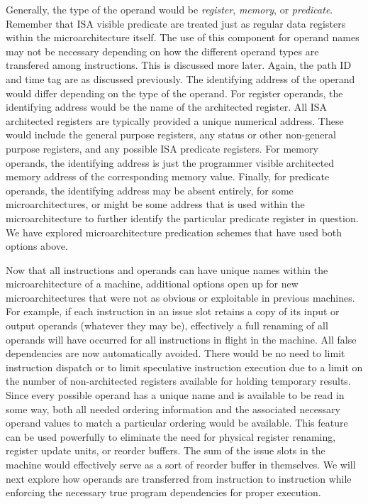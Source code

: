 \documentclass[10pt,dvips]{article}
\begin{document}
Generally, the type of the operand would be \textit{register},
\textit{memory}, or \textit{predicate}.
Remember that ISA visible predicate are treated just as regular
data registers within the microarchitecture itself.
The use of this component for operand names may not be
necessary depending on how the different operand types
are transfered among instructions.
This is discussed more later.
Again, the path ID and time tag are as discussed previously.
The identifying address of the operand would differ
depending on the type of the operand.
For register operands, the identifying address would be
the name of the architected register.
All ISA architected registers are typically provided a
unique numerical address.  These would include the
general purpose registers, any status or other non-general
purpose registers, and any possible ISA predicate registers.
For memory operands, the identifying address is just the
programmer visible architected memory address of the corresponding
memory value.
Finally, for predicate operands, the identifying address
may be absent entirely, for some microarchitectures, or
might be some address that is used within the microarchitecture
to further identify the particular predicate register in question.
We have explored microarchitecture predication schemes that 
have used both options above.

Now that all instructions and operands can have
unique names within the microarchitecture of a machine,
additional options open up for new microarchitectures
that were not as obvious or exploitable in previous
machines.
For example, if each instruction in an issue slot
retains a copy of its input or output operands (whatever
they may be), effectively a full renaming of
all operands will have occurred for all instructions
in flight in the machine.  
All false dependencies are now automatically avoided.
There would be no need to limit instruction dispatch or to limit speculative
instruction execution due to a limit on the number of non-architected
registers available for holding temporary results.
Since every possible operand has a unique name and is available
to be read in some way, both all needed ordering information
and the associated necessary operand values to match
a particular ordering would be available.
This feature can be used powerfully
to eliminate the need for physical register renaming,
register update units, or reorder buffers.
The sum of the issue slots in the machine would effectively serve
as a sort of reorder buffer in themselves.
We will next
explore how operands are transferred from
instruction to instruction while enforcing the necessary
true program dependencies for proper execution.
%
%
\end{document}
